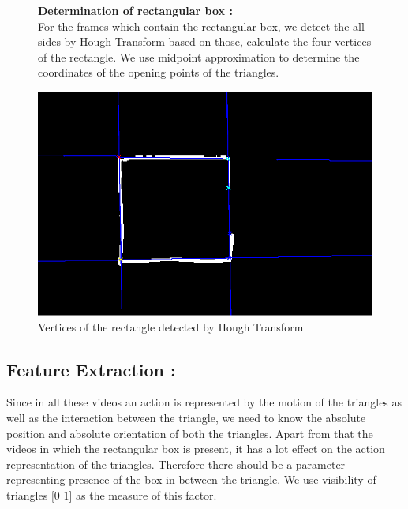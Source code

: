\documentclass[11pt]{report}
\begin{document}
\begin{figure}[H]
\begin{minipage}{0.5 \linewidth}
{\bf Determination of rectangular box :} \\
 \hspace*{10pt} For the frames which contain the rectangular box, we detect the all sides by Hough Transform based on those, calculate the four vertices of the rectangle. We use midpoint approximation to determine the coordinates of the opening points of the triangles. 
\end{minipage}
\begin{minipage}{0.4 \linewidth}
\center
\includegraphics[scale=0.3]{rectCoax.png}
\caption{Vertices of the rectangle detected by Hough Transform}
\end{minipage}
\end{figure}

\subsection*{Feature Extraction :}
\hspace*{10pt} Since in all these videos an action is represented by the motion of the triangles as well as the interaction between the triangle, we need to know the absolute position and absolute orientation of both the triangles. Apart from that the videos in which the rectangular box is present, it has a lot effect on the action representation of the triangles. Therefore there should be a parameter representing presence of the box in between the triangle. We use visibility of triangles $[0$ $1]$ as the measure of this factor.
\end{document}
